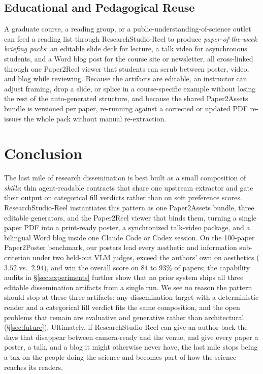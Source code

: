 \documentclass{article}
\begin{document}
\subsection{Educational and Pedagogical Reuse}\label{sec:app-edu}
A graduate course, a reading group, or a public-understanding-of-science outlet can feed a reading list through ResearchStudio-Reel to produce \emph{paper-of-the-week briefing packs}: an editable slide deck for lecture, a talk video for asynchronous students, and a Word blog post for the course site or newsletter, all cross-linked through one Paper2Reel viewer that students can scrub between poster, video, and blog while reviewing. Because the artifacts are editable, an instructor can adjust framing, drop a slide, or splice in a course-specific example without losing the rest of the auto-generated structure, and because the shared Paper2Assets bundle is versioned per paper, re-running against a corrected or updated PDF re-issues the whole pack without manual re-extraction.

\section{Conclusion}\label{sec:conclusion}

The last mile of research dissemination is best built as a small composition of \emph{skills}: thin agent-readable contracts that share one upstream extractor and gate their output on categorical fill verdicts rather than on soft preference scores. ResearchStudio-Reel instantiates this pattern as one Paper2Assets bundle, three editable generators, and the Paper2Reel viewer that binds them, turning a single paper PDF into a print-ready poster, a synchronized talk-video package, and a bilingual Word blog inside one Claude Code or Codex session.
On the 100-paper Paper2Poster benchmark, our posters lead every aesthetic and information sub-criterion under two held-out VLM judges, exceed the authors' own on aesthetics ($3.52$ vs.\ $2.94$), and win the overall score on $84$ to $93\%$ of papers; the capability audits in \S\ref{sec:experiments} further show that no prior system ships all three editable dissemination artifacts from a single run.
We see no reason the pattern should stop at these three artifacts: any dissemination target with a deterministic render and a categorical fill verdict fits the same composition, and the open problems that remain are evaluative and generative rather than architectural (\S\ref{sec:future}).
Ultimately, if ResearchStudio-Reel can give an author back the days that disappear between camera-ready and the venue, and give every paper a poster, a talk, and a blog it might otherwise never have, the last mile stops being a tax on the people doing the science and becomes part of how the science reaches its readers.
\end{document}
